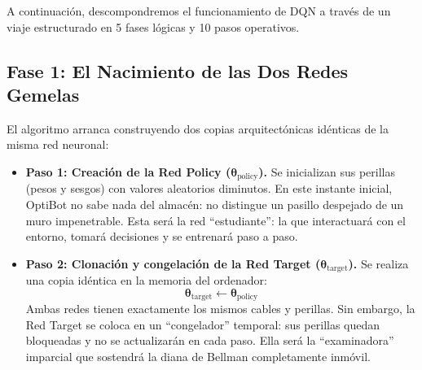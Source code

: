 A continuación, descompondremos el funcionamiento de DQN a través de un viaje estructurado en 5 fases lógicas y 10 pasos operativos.

\subsection{Fase 1: El Nacimiento de las Dos Redes Gemelas}
El algoritmo arranca construyendo dos copias arquitectónicas idénticas de la misma red neuronal:
\begin{itemize}
  \item \textbf{Paso 1: Creación de la Red Policy ($\boldsymbol{\theta}_{\text{policy}}$).} Se inicializan sus perillas (pesos y sesgos) con valores aleatorios diminutos. En este instante inicial, OptiBot no sabe nada del almacén: no distingue un pasillo despejado de un muro impenetrable. Esta será la red ``estudiante'': la que interactuará con el entorno, tomará decisiones y se entrenará paso a paso.
  \item \textbf{Paso 2: Clonación y congelación de la Red Target ($\boldsymbol{\theta}_{\text{target}}$).} Se realiza una copia idéntica en la memoria del ordenador:
  \begin{equation}
    \boldsymbol{\theta}_{\text{target}} \leftarrow \boldsymbol{\theta}_{\text{policy}}
  \end{equation}
  Ambas redes tienen exactamente los mismos cables y perillas. Sin embargo, la Red Target se coloca en un ``congelador'' temporal: sus perillas quedan bloqueadas y no se actualizarán en cada paso. Ella será la ``examinadora'' imparcial que sostendrá la diana de Bellman completamente inmóvil.
\end{itemize}

